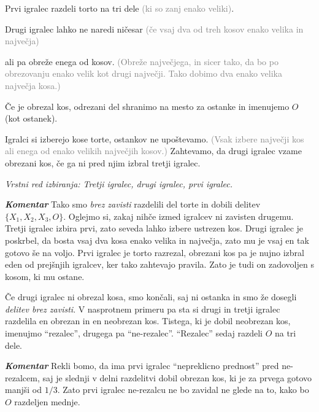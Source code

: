 \documentclass[a4paper,12pt]{article}
\begin{document}
\begin{protokol}

\item Prvi igralec razdeli torto na tri dele \textcolor{gray}{(ki so zanj enako veliki)}.

\item Drugi igralec lahko ne naredi ničesar \textcolor{gray}{(če vsaj dva od treh kosov enako velika in največja)}

ali pa obreže enega od kosov. \textcolor{gray}{(Obreže največjega, in sicer tako, da bo po obrezovanju enako velik kot drugi največji. Tako dobimo dva enako velika največja kosa.)}

Če je obrezal kos, odrezani del shranimo na mesto za ostanke in imenujemo $O$ (kot ostanek).

\item Igralci si izberejo kose torte, ostankov ne upoštevamo. \textcolor{gray}{(Vsak izbere največji kos ali enega od enako velikih največjih kosov.)} Zahtevamo, da drugi igralec vzame obrezani kos, če ga ni pred njim izbral tretji igralec.

\textsl{Vrstni red izbiranja: Tretji igralec, drugi igralec, prvi igralec.}

\item [\textbf{\em Komentar}] Tako smo {\em brez zavisti} razdelili del torte in dobili delitev ${\{X_1, X_2, X_3, O\}}$. Oglejmo si, zakaj nihče izmed igralcev ni zavisten drugemu. Tretji igralec izbira prvi, zato seveda lahko izbere ustrezen kos. Drugi igralec je poskrbel, da bosta vsaj dva kosa enako velika in največja, zato mu je vsaj en tak gotovo še na voljo. Prvi igralec je torto razrezal, obrezani kos pa je nujno izbral eden od prejšnjih igralcev, ker tako zahtevajo pravila. Zato je tudi on zadovoljen s kosom, ki mu ostane.

\item Če drugi igralec ni obrezal kosa, smo končali, saj ni ostanka in smo že dosegli {\em delitev brez zavisti}. V nasprotnem primeru pa sta si drugi in tretji igralec razdelila en obrezan in en neobrezan kos. Tistega, ki je dobil neobrezan kos, imenujmo ``rezalec'', drugega pa ``ne-rezalec''. ``Rezalec'' sedaj razdeli $O$ na tri dele.

\item [\textbf{\em Komentar}] Rekli bomo, da ima prvi igralec ``nepreklicno prednost'' pred ne-rezalcem, saj je slednji v delni razdelitvi dobil obrezan kos, ki je za prvega gotovo manjši od $1/3$. Zato prvi igralec ne-rezalcu ne bo zavidal ne glede na to, kako bo $O$ razdeljen mednje.


\end{protokol}
\end{document}
